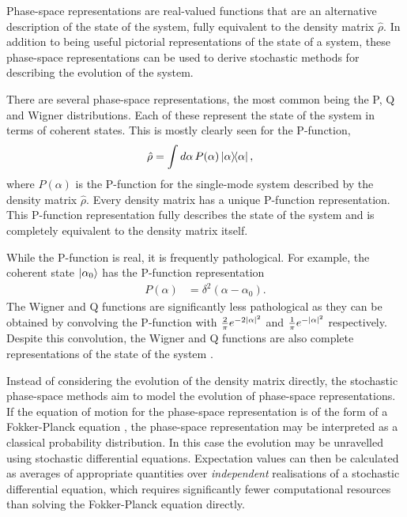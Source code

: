 
Phase-space representations are real-valued functions that are an alternative description of the state of the system, fully equivalent to the density matrix $\hat{\rho}$.  In addition to being useful pictorial representations of the state of a system, these phase-space representations can be used to derive stochastic methods for describing the evolution of the system.

There are several phase-space representations, the most common being the P, Q and Wigner distributions.  Each of these represent the state of the system in terms of coherent states.  This is mostly clearly seen for the P-function,
\begin{align}
    \hat{\rho} &= \int d \alpha\, P(\alpha) \ketbra{\alpha}{\alpha}, \label{BackgroundTheory:PFunction}
\end{align}
where $P(\alpha)$ is the P-function for the single-mode system described by the density matrix $\hat{\rho}$.  Every density matrix has a unique P-function representation.  This P-function representation fully describes the state of the system and is completely equivalent to the density matrix itself.  

While the P-function is real, it is frequently pathological.  For example, the coherent state ${\left|\alpha_0\right>}$ has the P-function representation
\begin{align}
    P(\alpha) &= \delta^2(\alpha - \alpha_0).
\end{align}
The Wigner and Q functions are significantly less pathological as they can be obtained by convolving the P-function with $\frac{2}{\pi}e^{-2 \left|\alpha\right|^2}$ and $\frac{1}{\pi} e^{-\left|\alpha\right|^2}$ respectively.  Despite this convolution, the Wigner and Q functions are also complete representations of the state of the system \citep{GardinerQN}.

Instead of considering the evolution of the density matrix directly, the stochastic phase-space methods aim to model the evolution of phase-space representations.  If the equation of motion for the phase-space representation is of the form of a Fokker-Planck equation \citep{GardinerHSM}, the phase-space representation may be interpreted as a classical probability distribution.  In this case the evolution may be unravelled using stochastic differential equations.  Expectation values can then be calculated as averages of appropriate quantities over \emph{independent} realisations of a stochastic differential equation, which requires significantly fewer computational resources than solving the Fokker-Planck equation directly.  

